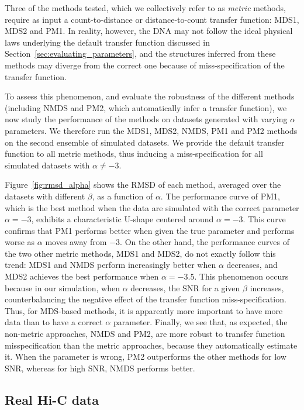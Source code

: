 Three of the methods tested, which we collectively refer to as \emph{metric}
methods, require as input a count-to-distance or distance-to-count transfer
function: MDS1, MDS2 and PM1. In reality, however, the DNA may not follow the
ideal physical laws underlying the default transfer function discussed in
Section~\ref{sec:evaluating_parameters}, and the structures inferred from
these methods may diverge from the correct one because of miss-specification
of the transfer function.

To assess this phenomenon, and evaluate the robustness of the different
methods (including NMDS and PM2, which automatically infer a transfer
function), we now study the performance of the methods on datasets generated
with varying $\alpha$ parameters. We therefore run the MDS1, MDS2, NMDS, PM1
and PM2 methods on the second ensemble of simulated datasets. We provide the
default transfer function to all metric methods, thus inducing a
miss-specification for all simulated datasets with $\alpha\neq -3$.

Figure~\ref{fig:rmsd_alpha} shows the RMSD of each method, averaged
over the datasets with different $\beta$, as a function of $\alpha$.
The performance curve of PM1, which is the best method when the data
are simulated with the correct parameter $\alpha=-3$, exhibits a
characteristic U-shape centered around $\alpha = -3$. This curve
confirms that PM1 performs better when given the true parameter and
performs worse as $\alpha$ moves away from $-3$. On the other hand,
the performance curves of the two other metric methods, MDS1 and MDS2,
do not exactly follow this trend: MDS1 and NMDS perform increasingly
better when $\alpha$ decreases, and MDS2 achieves the best performance
when $\alpha = -3.5$. This phenomenon occurs because in our
simulation, when $\alpha$ decreases, the SNR for a given $\beta$
increases, counterbalancing the negative effect of the transfer
function miss-specification.  Thus, for MDS-based methods, it is
apparently more important to have more data than to have a correct
$\alpha$ parameter. Finally, we see that, as expected, the non-metric
approaches, NMDS and PM2, are more robust to transfer function
misspecification than the metric approaches, because they
automatically estimate it. When the parameter is wrong, PM2
outperforms the other methods for low SNR, whereas for high SNR, NMDS
performs better.

\subsection{Real Hi-C data}

